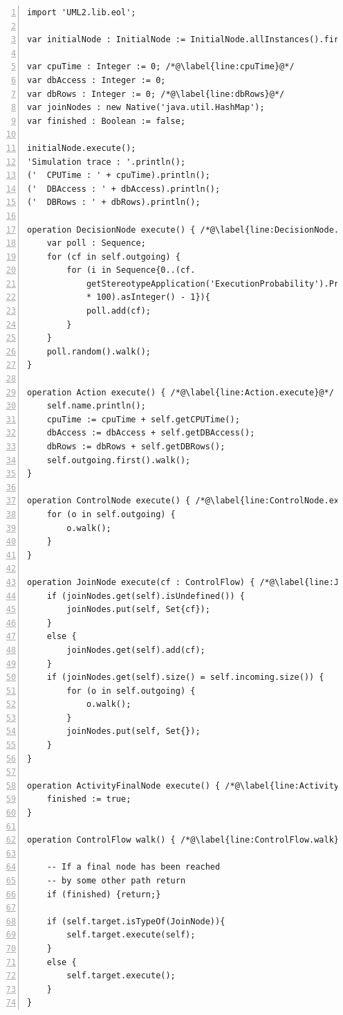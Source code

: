 \begin{lstlisting}[basicstyle=\ttfamily\footnotesize, flexiblecolumns=true, numbers=left, nolol=true, caption=Simulation using EOL, label=lst:SAP.EOL, language=EOL, tabsize=2]
import 'UML2.lib.eol';

var initialNode : InitialNode := InitialNode.allInstances().first();

var cpuTime : Integer := 0; /*@\label{line:cpuTime}@*/
var dbAccess : Integer := 0;
var dbRows : Integer := 0; /*@\label{line:dbRows}@*/
var joinNodes : new Native('java.util.HashMap');
var finished : Boolean := false;

initialNode.execute();
'Simulation trace : '.println();
('	CPUTime : ' + cpuTime).println();
('	DBAccess : ' + dbAccess).println();
('	DBRows : ' + dbRows).println();

operation DecisionNode execute() { /*@\label{line:DecisionNode.execute}@*/
	var poll : Sequence;
	for (cf in self.outgoing) {
		for (i in Sequence{0..(cf.
			getStereotypeApplication('ExecutionProbability').Probability 
			* 100).asInteger() - 1}){
			poll.add(cf);
		}
	}
	poll.random().walk();
}

operation Action execute() { /*@\label{line:Action.execute}@*/
	self.name.println();
	cpuTime := cpuTime + self.getCPUTime();
	dbAccess := dbAccess + self.getDBAccess();
	dbRows := dbRows + self.getDBRows();
	self.outgoing.first().walk();
}

operation ControlNode execute() { /*@\label{line:ControlNode.execute}@*/
	for (o in self.outgoing) {
		o.walk();
	}
}

operation JoinNode execute(cf : ControlFlow) { /*@\label{line:JoinNode.execute}@*/
	if (joinNodes.get(self).isUndefined()) {
		joinNodes.put(self, Set{cf});
	}
	else {
		joinNodes.get(self).add(cf);
	}
	if (joinNodes.get(self).size() = self.incoming.size()) {
		for (o in self.outgoing) {
			o.walk();
		}
		joinNodes.put(self, Set{});
	}
}

operation ActivityFinalNode execute() { /*@\label{line:ActivityFinalNode.execute}@*/
	finished := true;
}

operation ControlFlow walk() { /*@\label{line:ControlFlow.walk}@*/
	
	-- If a final node has been reached
	-- by some other path return
	if (finished) {return;}

	if (self.target.isTypeOf(JoinNode)){
		self.target.execute(self);
	}
	else {
		self.target.execute();
	}
}
\end{lstlisting}

